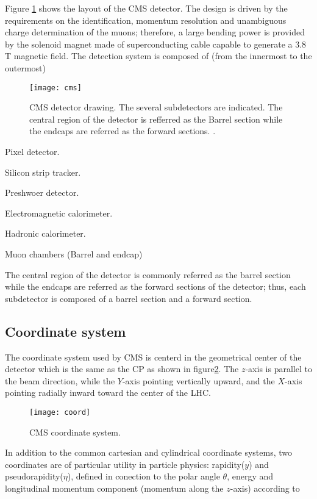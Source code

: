 \noindent Figure \ref{fig:cms} shows the layout of the CMS detector. The design is driven by the requirements on the identification, momentum resolution and unambiguous charge determination of the muons; therefore, a large bending power is provided by the solenoid magnet made of superconducting cable capable to generate a 3.8 T magnetic field. The detection system is composed of (from the innermost to the outermost)

\begin{figure}[!h]
  \centering
  \texttt{[image: cms]}
  \caption[CMS detector drawing]{CMS detector drawing. The several subdetectors are indicated. The central region of the detector is refferred as the Barrel section while the endcaps are referred as the forward sections. \cite{cms_drawing}.}
  \label{fig:cms}
\end{figure}

\noindent 

\bit
\item Pixel detector.
\item Silicon strip tracker.
\item Preshwoer detector.
\item Electromagnetic calorimeter.
\item Hadronic calorimeter.
\item Muon chambers (Barrel and endcap)
\eit

\noindent The central region of the detector is commonly referred as the barrel section while the endcaps are referred as the forward sections of the detector; thus, each subdetector is composed of a barrel section and a forward section. 


\subsection{Coordinate system}
\noindent The coordinate system used by CMS is centerd in the geometrical center of the detector which is the same as the CP as shown in figure\ref{fig:coord}. The $z$-axis is parallel to the beam direction, while the $Y$-axis pointing vertically upward, and the $X$-axis pointing radially inward toward the center of the LHC.

\begin{figure}[h!]
  \centering
  \texttt{[image: coord]}
  \caption[CMS coordinate system]{CMS coordinate system.}
  \label{fig:coord}
\end{figure}

\noindent In addition to the common cartesian and cylindrical coordinate systems, two coordinates are of particular utility in particle physics: rapidity($y$) and pseudorapidity($\eta$), defined in conection to the polar angle $\theta$, energy and longitudinal momentum component (momentum along the $z$-axis) according to

